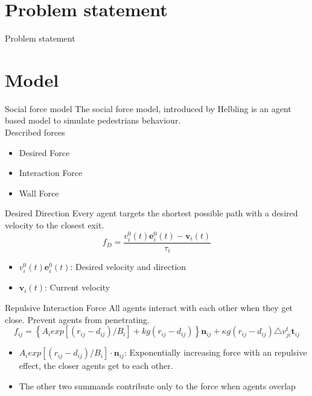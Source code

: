 \section{Problem statement}

\begin{frame}{Problem statement}
\end{frame}


\section{Model}

\begin{frame}{Social force model}
The social force model, introduced by Helbling is an agent based model to simulate pedestrians behaviour.\\
Described forces
\begin{itemize}
\item Desired Force
\item Interaction Force
\item Wall Force
\end{itemize}
\end{frame}

\begin{frame}{Desired Direction}
Every agent targets the shortest possible path with a desired velocity to the closest exit.
\begin{equation*}
f_{D}=\frac{v_{i}^{0}(t)\mathbf{e}_{i}^{0}(t)-\mathbf{v}_{i}(t)}{\tau_{i}}
\end{equation*}
\begin{itemize}
\item $v_{i}^{0}(t)\mathbf{e}_{i}^{0}(t)$: Desired velocity and direction
\item $\mathbf{v}_{i}(t)$: Current velocity
\end{itemize}
\end{frame}

\begin{frame}{Repulsive Interaction Force}
All agents interact with each other when they get close. Prevent agents from penetrating.
\begin{equation*}
f_{ij}=\left\{A_{i}exp[(r_{ij}-d_{ij})/B_{i}]+kg(r_{ij}-d_{ij})\right\}\mathbf{n}_{ij}+\kappa g(r_{ij}-d_{ij})\triangle v_{ji}^t\mathbf{t}_{ij}
\end{equation*}
\begin{itemize}
\item $A_{i}exp[(r_{ij}-d_{ij})/B_{i}]\cdot\mathbf{n}_{ij}$: Exponentially increasing force with an repulsive effect, the closer agents get to each other.
\item The other two summands contribute only to the force when agents overlap
\end{itemize}
\end{frame}

